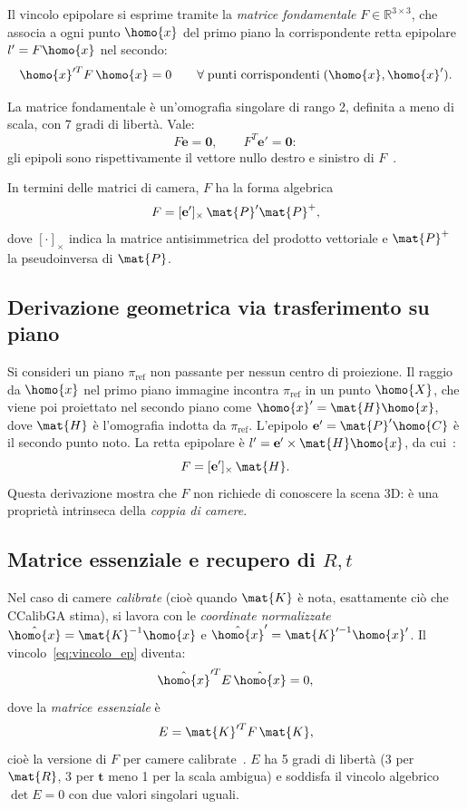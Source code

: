 Il vincolo epipolare si esprime tramite la \emph{matrice fondamentale}
\(F\in\mathbb{R}^{3\times3}\), che associa a ogni punto \(\homo{x}\)
del primo piano la corrispondente retta epipolare
\(l'=F\homo{x}\) nel secondo:
\begin{equation}
  \homo{x}'^T F\,\homo{x} = 0
  \qquad \forall\;\text{punti corrispondenti}\;(\homo{x},\homo{x}').
  \label{eq:vincolo_ep}
\end{equation}

\begin{prop}[Proprietà di \(F\)]
La matrice fondamentale è un'omografia singolare di rango 2, definita
a meno di scala, con 7 gradi di libertà.  Vale:
\[
  F\mathbf{e}=\mathbf{0}, \qquad F^T\mathbf{e}'=\mathbf{0}:
\]
gli epipoli sono rispettivamente il vettore nullo destro e sinistro di
\(F\)~\cite[Sez.~9.2]{HZ2004}.
\end{prop}

In termini delle matrici di camera, \(F\) ha la forma algebrica
\[
  F = [\mathbf{e}']_{\times}\,\mat{P}'\mat{P}^+,
  \label{eq:F_dalle_camere}
\]
dove \([\cdot]_{\times}\) indica la matrice antisimmetrica del prodotto
vettoriale e \(\mat{P}^+\) la pseudoinversa di \(\mat{P}\).

\subsection{Derivazione geometrica via trasferimento su piano}

Si consideri un piano \(\pi_\text{ref}\) non passante per nessun centro
di proiezione.  Il raggio da \(\homo{x}\) nel primo piano immagine
incontra \(\pi_\text{ref}\) in un punto \(\homo{X}\), che viene poi
proiettato nel secondo piano come \(\homo{x}'=\mat{H}\homo{x}\),
dove \(\mat{H}\) è l'omografia indotta da \(\pi_\text{ref}\).
L'epipolo \(\mathbf{e}'=\mat{P}'\homo{C}\) è il secondo punto noto.
La retta epipolare è \(l'=\mathbf{e}'\times\mat{H}\homo{x}\),
da cui~\cite[Sez.~9.2.1]{HZ2004}:
\[
  F = [\mathbf{e}']_{\times}\,\mat{H}.
\]
Questa derivazione mostra che \(F\) non richiede di conoscere la
scena 3D: è una proprietà intrinseca della \emph{coppia di camere}.

\subsection{Matrice essenziale e recupero di \texorpdfstring{\(R, t\)}{R, t}}

Nel caso di camere \emph{calibrate} (cioè quando \(\mat{K}\) è nota,
esattamente ciò che CCalibGA stima), si lavora con le \emph{coordinate
normalizzate} \(\hat{\homo{x}}=\mat{K}^{-1}\homo{x}\) e
\(\hat{\homo{x}}'=\mat{K}'^{-1}\homo{x}'\).
Il vincolo~\eqref{eq:vincolo_ep} diventa:
\[
  \hat{\homo{x}}'^T E\,\hat{\homo{x}} = 0,
\]
dove la \emph{matrice essenziale} è
\begin{equation}
  E = \mat{K}'^T F\,\mat{K},
  \label{eq:essential}
\end{equation}
cioè la versione di \(F\) per camere calibrate~\cite[Sez.~9.6]{HZ2004}.
\(E\) ha 5 gradi di libertà (3 per \(\mat{R}\), 3 per \(\mathbf{t}\)
meno 1 per la scala ambigua) e soddisfa il vincolo algebrico
\(\det E = 0\) con due valori singolari uguali.

